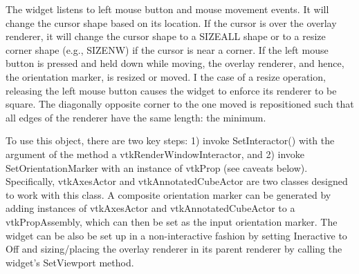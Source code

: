 The widget listens to left mouse button and mouse movement events. It will change the cursor shape based on its location. If the cursor is over the overlay renderer, it will change the cursor shape to a S\-I\-Z\-E\-A\-L\-L shape or to a resize corner shape (e.\-g., S\-I\-Z\-E\-N\-W) if the cursor is near a corner. If the left mouse button is pressed and held down while moving, the overlay renderer, and hence, the orientation marker, is resized or moved. I the case of a resize operation, releasing the left mouse button causes the widget to enforce its renderer to be square. The diagonally opposite corner to the one moved is repositioned such that all edges of the renderer have the same length\-: the minimum.

To use this object, there are two key steps\-: 1) invoke Set\-Interactor() with the argument of the method a vtk\-Render\-Window\-Interactor, and 2) invoke Set\-Orientation\-Marker with an instance of vtk\-Prop (see caveats below). Specifically, vtk\-Axes\-Actor and vtk\-Annotated\-Cube\-Actor are two classes designed to work with this class. A composite orientation marker can be generated by adding instances of vtk\-Axes\-Actor and vtk\-Annotated\-Cube\-Actor to a vtk\-Prop\-Assembly, which can then be set as the input orientation marker. The widget can be also be set up in a non-\/interactive fashion by setting Ineractive to Off and sizing/placing the overlay renderer in its parent renderer by calling the widget's Set\-Viewport method.


